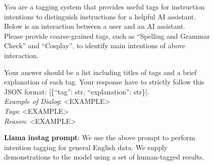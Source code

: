 \begin{figure}
  
\begin{framed}

You are a tagging system that provides useful tags for instruction intentions to distinguish instructions for a helpful AI assistant.
Below is an interaction between a user and an AI assistant. \\

Please provide coarse-grained tags, such as ``Spelling and Grammar Check'' and ``Cosplay'', to identify main intentions of above interaction. 

Your answer should be a list including titles of tags and a brief explanation of each tag.
Your response have to strictly follow this JSON format: [\{``tag'': str, ``explanation'': str\}].\\

\emph{Example of Dialog}: <EXAMPLE> \\
\emph{Tags}: <EXAMPLE> \\
\emph{Reason}: <EXAMPLE> 

\end{framed}

  \caption{\textbf{Llama instag prompt}: We use the above prompt to perform intention tagging for general English data. We supply demonstrations to the model using a set of human-tagged results.}
  \label{fig:instag_prompt}
\end{figure}



